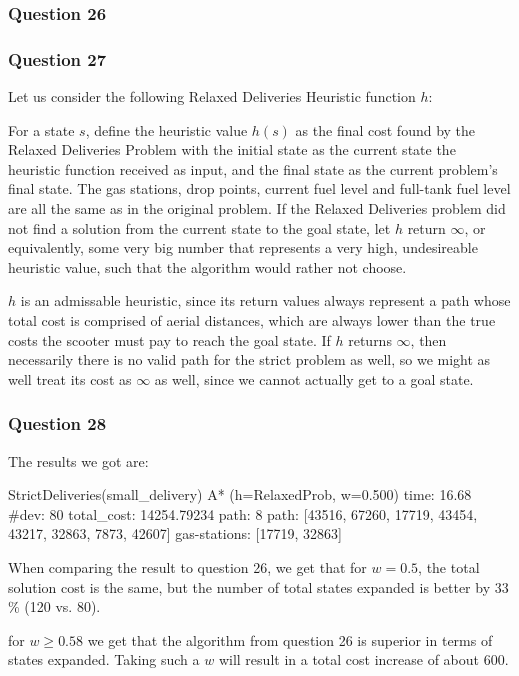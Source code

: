 \documentclass[11pt]{article}
\begin{document}
    \subsubsection{Question 26}\label{question-26}

    \subsubsection{Question 27}\label{question-27}

Let us consider the following Relaxed Deliveries Heuristic function
\(h\):

For a state \(s\), define the heuristic value \(h(s)\) as the final cost
found by the Relaxed Deliveries Problem with the initial state as the
current state the heuristic function received as input, and the final
state as the current problem's final state. The gas stations, drop
points, current fuel level and full-tank fuel level are all the same as
in the original problem. If the Relaxed Deliveries problem did not find
a solution from the current state to the goal state, let \(h\) return
\(\infty\), or equivalently, some very big number that represents a very
high, undesireable heuristic value, such that the algorithm would rather
not choose.

\(h\) is an admissable heuristic, since its return values always
represent a path whose total cost is comprised of aerial distances,
which are always lower than the true costs the scooter must pay to reach
the goal state. If \(h\) returns \(\infty\), then necessarily there is
no valid path for the strict problem as well, so we might as well treat
its cost as \(\infty\) as well, since we cannot actually get to a goal
state.

    \subsubsection{Question 28}\label{question-28}

The results we got are:

StrictDeliveries(small\_delivery) A* (h=RelaxedProb, w=0.500) time:
16.68 \#dev: 80 total\_cost: 14254.79234 \textbar{}path\textbar{}: 8
path: {[}43516, 67260, 17719, 43454, 43217, 32863, 7873, 42607{]}
gas-stations: {[}17719, 32863{]}

When comparing the result to question 26, we get that for \(w=0.5\), the
total solution cost is the same, but the number of total states expanded
is better by \(33\)\% (120 vs. 80).

for \(w\geq0.58\) we get that the algorithm from question 26 is superior
in terms of states expanded. Taking such a \(w\) will result in a total
cost increase of about 600.
\end{document}

